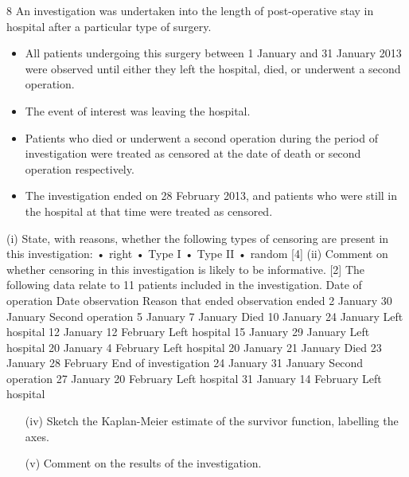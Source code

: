 \documentclass[a4paper,12pt]{article}
\begin{document}
8 An investigation was undertaken into the length of post-operative stay in hospital after
a particular type of surgery. 
\begin{itemize}
    \item All patients undergoing this surgery between 1 January
and 31 January 2013 were observed until either they left the hospital, died, or
underwent a second operation. 
\item The event of interest was leaving the hospital.
\item Patients who died or underwent a second operation during the period of investigation
were treated as censored at the date of death or second operation respectively. 
\item The
investigation ended on 28 February 2013, and patients who were still in the hospital at
that time were treated as censored.
\end{itemize}
(i) State, with reasons, whether the following types of censoring are present in
this investigation:
  • right
• Type I
• Type II
• random
[4]
(ii) Comment on whether censoring in this investigation is likely to be
informative. [2]
The following data relate to 11 patients included in the investigation.
Date of operation Date observation Reason that
ended observation
ended
2 January 30 January Second operation
5 January 7 January Died
10 January 24 January Left hospital
12 January 12 February Left hospital
15 January 29 January Left hospital
20 January 4 February Left hospital
20 January 21 January Died
23 January 28 February End of investigation
24 January 31 January Second operation
27 January 20 February Left hospital
31 January 14 February Left hospital
\begin{itemize}
\ite[(iii)] Calculate the Kaplan-Meier estimate of the survivor function for remaining in
the hospital.
\item[(iv)] Sketch the Kaplan-Meier estimate of the survivor function, labelling the axes.

\item[(v)] Comment on the results of the investigation. 
\end{itemize}
\end{document}
